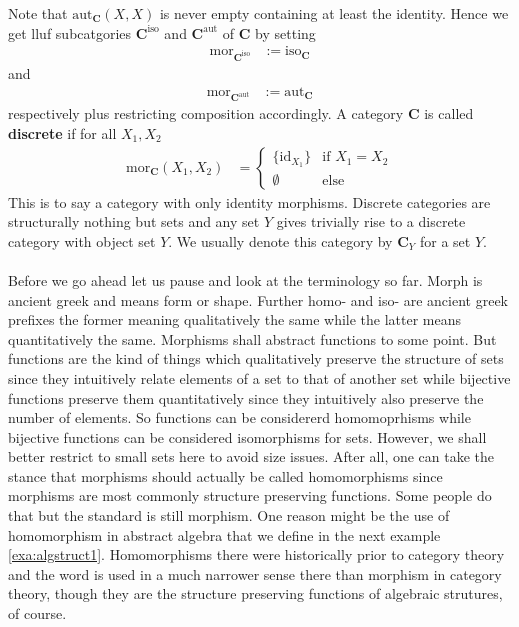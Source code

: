 Note that $\mathrm{aut}_{\mathbf{C}}(X,X)$ is never empty containing at least the identity. Hence we get lluf subcatgories $\mathbf{C}^{\mathrm{iso}}$ and $\mathbf{C}^{\mathrm{aut}}$ of $\mathbf{C}$ by setting
\begin{align*}
  \mathrm{mor}_{\mathbf{C}^{\mathrm{iso}}}
  &:=
  \mathrm{iso}_{\mathbf{C}}
\end{align*}
and
\begin{align*}
  \mathrm{mor}_{\mathbf{C}^{\mathrm{aut}}}
  &:=
  \mathrm{aut}_{\mathbf{C}}
\end{align*}
respectively plus restricting composition accordingly. A category $\mathbf{C}$ is called \textbf{discrete} if for all $X_{1},X_{2}$
\begin{align*}
  \mathrm{mor}_{\mathbf{C}}(X_{1},X_{2})
  &=
  \begin{cases}
    \lbrace
      \mathrm{id}_{X_{1}}
    \rbrace
    &
    \text{if }
    X_{1}
    =
    X_{2}
    \\
    \emptyset
    &
    \text{else}
  \end{cases}
\end{align*}
This is to say a category with only identity morphisms. Discrete categories are structurally nothing but sets and any set $Y$ gives trivially rise to a discrete category with object set $Y$. We usually denote this category by $\mathbf{C}_{Y}$ for a set $Y$.
\\\\
Before we go ahead let us pause and look at the terminology so far. {\glqq}Morph{\grqq} is ancient greek and means {\glqq}form{\grqq} or {\glqq}shape{\grqq}. Further {\glqq}homo-{\grqq} and {\glqq}iso-{\grqq} are ancient greek prefixes the former meaning {\glqq}qualitatively the same{\grqq} while the latter means {\glqq}quantitatively the same{\grqq}. Morphisms shall abstract functions to some point. But functions are the kind of things which qualitatively preserve the structure of sets since they intuitively relate elements of a set to that of another set while bijective functions preserve them quantitatively since they intuitively also preserve the {\glqq}number{\grqq} of elements. So functions can be considererd homomoprhisms while bijective functions can be considered isomorphisms for sets. However, we shall better restrict to small sets here to avoid size issues. After all, one can take the stance that morphisms should actually be called homomorphisms since morphisms are most commonly structure preserving functions. Some people do that but the standard is still morphism. One reason might be the use of homomorphism in abstract algebra that we define in the next example \ref{exa:algstruct1}. Homomorphisms there were historically prior to category theory and the word is used in a much narrower sense there than morphism in category theory, though they are the structure preserving functions of algebraic strutures, of course.
